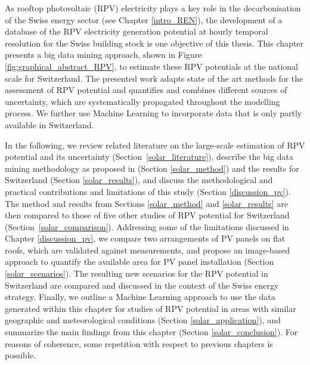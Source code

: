 As rooftop photovoltaic (RPV) electricity plays a key role in the decarbonisation of the Swiss energy sector (see Chapter \ref{intro_REN}), the development of a database of the RPV electricity generation potential at hourly temporal resolution for the Swiss building stock is one objective of this thesis.
This chapter presents a big data mining approach, shown in Figure \ref{fig:graphical_abstract_RPV}, to estimate these RPV potentials at the national scale for Switzerland. 
The presented work adapts state of the art methods for the assessment of RPV potential and quantifies and combines different sources of uncertainty, which are systematically propagated throughout the modelling process.
We further use Machine Learning to incorporate data that is only partly available in Switzerland.

In the following, we review related literature on the large-scale estimation of RPV potential and its uncertainty (Section~\ref{solar_literature}), describe the big data mining methodology as proposed in \cite{walch_big_2020} (Section \ref{solar_method}) and the results for Switzerland (Section \ref{solar_results}), and discuss the methodological and practical contributions and limitations of this study (Section \ref{discussion_pv}). 
The method and results from Sections \ref{solar_method} and \ref{solar_results} are then compared to those of five other studies of RPV potential for Switzerland (Section~\ref{solar_comparison}).
Addressing some of the limitations discussed in Chapter \ref{discussion_pv}, we compare two arrangements of PV panels on flat roofs, which are validated against measurements, and propose an image-based approach to quantify the available area for PV panel installation (Section \ref{solar_scenarios}). 
The resulting new scenarios for the RPV potential in Switzerland are compared and discussed in the context of the Swiss energy strategy. 
Finally, we outline a Machine Learning approach to use the data generated within this chapter for studies of RPV potential in areas with similar geographic and meteorological conditions (Section \ref{solar_application}), and summarize the main findings from this chapter (Section \ref{solar_conclusion}).
For reasons of coherence, some repetition with respect to  previous chapters is possible.

